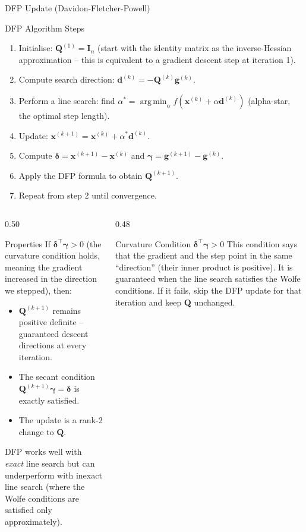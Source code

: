 \documentclass[aspectratio=169,10pt]{beamer}
\newcommand{\xbf}{\mathbf{x}}
\newcommand{\gbf}{\mathbf{g}}
\newcommand{\Ibf}{\mathbf{I}}
\newcommand{\deltabf}{\boldsymbol{\delta}}
\newcommand{\gammabf}{\boldsymbol{\gamma}}
\DeclareMathOperator*{\argmin}{arg\,min}
\begin{document}
\begin{frame}[allowframebreaks]{DFP Update (Davidon-Fletcher-Powell)}
  \begin{block}{DFP Algorithm Steps}
    \begin{enumerate}
      \item Initialise: $\mathbf{Q}^{(1)} = \Ibf_n$ (start with the identity
        matrix as the inverse-Hessian approximation -- this is equivalent to a
        gradient descent step at iteration 1).
      \item Compute search direction: $\mathbf{d}^{(k)} = -\mathbf{Q}^{(k)}\gbf^{(k)}$.
      \item Perform a line search: find $\alpha^* = \argmin_\alpha f(\xbf^{(k)} +
        \alpha\mathbf{d}^{(k)})$ (alpha-star, the optimal step length).
      \item Update: $\xbf^{(k+1)} = \xbf^{(k)} + \alpha^*\mathbf{d}^{(k)}$.
      \item Compute $\deltabf = \xbf^{(k+1)} - \xbf^{(k)}$ and $\gammabf =
        \gbf^{(k+1)} - \gbf^{(k)}$.
      \item Apply the DFP formula to obtain $\mathbf{Q}^{(k+1)}$.
      \item Repeat from step 2 until convergence.
    \end{enumerate}
  \end{block}

  \begin{columns}[T]
    \begin{column}{0.50\textwidth}
      \begin{block}{Properties}
        If $\deltabf^\top\gammabf > 0$ (the curvature condition holds, meaning the
        gradient increased in the direction we stepped), then:
        \begin{itemize}
          \item $\mathbf{Q}^{(k+1)}$ remains positive definite -- guaranteed
            descent directions at every iteration.
          \item The secant condition $\mathbf{Q}^{(k+1)}\gammabf = \deltabf$ is
            exactly satisfied.
          \item The update is a rank-2 change to $\mathbf{Q}$.
        \end{itemize}
        DFP works well with \emph{exact} line search but can underperform with
        inexact line search (where the Wolfe conditions are satisfied only
        approximately).
      \end{block}
    \end{column}
    \begin{column}{0.48\textwidth}
      \begin{alertblock}{Curvature Condition $\deltabf^\top\gammabf > 0$}
        This condition says that the gradient and the step point in the same
        ``direction'' (their inner product is positive).  It is guaranteed when the
        line search satisfies the Wolfe conditions.  If it fails, skip the DFP
        update for that iteration and keep $\mathbf{Q}$ unchanged.
      \end{alertblock}
    \end{column}
  \end{columns}

\end{frame}
\end{document}
